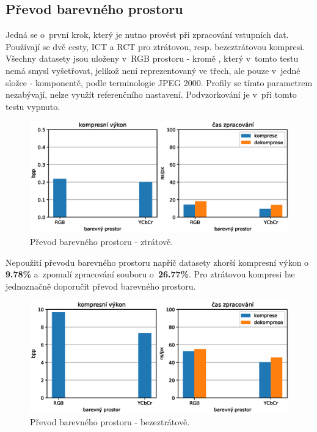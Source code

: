 \subsection*{Převod barevného prostoru}
Jedná se o~první krok, který je nutno provést při zpracování vstupních dat. Používají se dvě cesty, ICT a RCT pro ztrátovou, resp. bezeztrátovou kompresi. Všechny datasety jsou uloženy v~RGB prostoru - kromě , který v~tomto testu nemá smysl vyšetřovat, jelikož není reprezentovaný ve třech, ale pouze v~jedné složce - komponentě, podle terminologie JPEG 2000. Profily se tímto parametrem nezabývají, nelze využít referenčního nastavení. Podvzorkování je v~při tomto testu vypnuto.
\newline

\begin{figure}[hbt!]
  \centering
  \hspace*{-0.75cm}
  \includegraphics[width=16cm]{obrazky-figures/rgb_ycrcb/fotky_rgb_ycrcb.eps}
  \caption{Převod barevného prostoru - ztrátově.}
\end{figure}

\noindent Nepoužití převodu barevného prostoru napříč datasety zhorší kompresní výkon o \textbf{9.78\%} a~zpomalí zpracování souboru o~\textbf{26.77\%}. Pro ztrátovou kompresi lze jednoznačně doporučit převod barevného prostoru.
\clearpage
\begin{figure}[hbt!]
  \centering
  \hspace*{-0.75cm}
  \includegraphics[width=16cm]{obrazky-figures/rgb_ycrcb/fotky_full_rgb_ycrcb.eps}
  \caption{Převod barevného prostoru - bezeztrátově.}
\end{figure}

